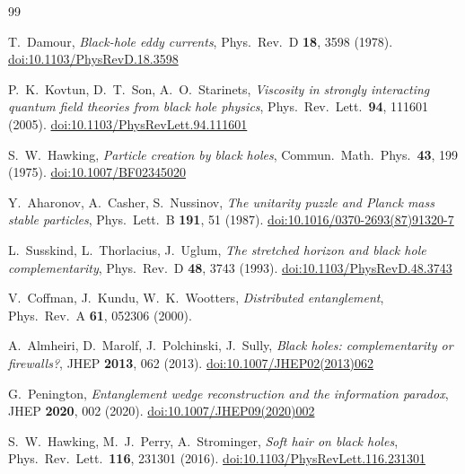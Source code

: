\documentclass[11pt,a4paper]{article}
\begin{document}
\clearpage
\sloppy\raggedright
\begin{thebibliography}{99}

  T.~Damour,
  \textit{Black-hole eddy currents},
  Phys.\ Rev.\ D \textbf{18}, 3598 (1978).
  \href{https://doi.org/10.1103/PhysRevD.18.3598}{doi:10.1103/PhysRevD.18.3598}

  P.~K.~Kovtun, D.~T.~Son, A.~O.~Starinets,
  \textit{Viscosity in strongly interacting quantum field theories from black hole physics},
  Phys.\ Rev.\ Lett.\ \textbf{94}, 111601 (2005).
  \href{https://doi.org/10.1103/PhysRevLett.94.111601}{doi:10.1103/PhysRevLett.94.111601}

  S.~W.~Hawking,
  \textit{Particle creation by black holes},
  Commun.\ Math.\ Phys.\ \textbf{43}, 199 (1975).
  \href{https://doi.org/10.1007/BF02345020}{doi:10.1007/BF02345020}

  Y.~Aharonov, A.~Casher, S.~Nussinov,
  \textit{The unitarity puzzle and Planck mass stable particles},
  Phys.\ Lett.\ B \textbf{191}, 51 (1987).
  \href{https://doi.org/10.1016/0370-2693(87)91320-7}{doi:10.1016/0370-2693(87)91320-7}

  L.~Susskind, L.~Thorlacius, J.~Uglum,
  \textit{The stretched horizon and black hole complementarity},
  Phys.\ Rev.\ D \textbf{48}, 3743 (1993).
  \href{https://doi.org/10.1103/PhysRevD.48.3743}{doi:10.1103/PhysRevD.48.3743}

  V.~Coffman, J.~Kundu, W.~K.~Wootters,
  \textit{Distributed entanglement},
  Phys.\ Rev.\ A \textbf{61}, 052306 (2000).

  A.~Almheiri, D.~Marolf, J.~Polchinski, J.~Sully,
  \textit{Black holes: complementarity or firewalls?},
  JHEP \textbf{2013}, 062 (2013).
  \href{https://doi.org/10.1007/JHEP02(2013)062}{doi:10.1007/JHEP02(2013)062}

  G.~Penington,
  \textit{Entanglement wedge reconstruction and the information paradox},
  JHEP \textbf{2020}, 002 (2020).
  \href{https://doi.org/10.1007/JHEP09(2020)002}{doi:10.1007/JHEP09(2020)002}

  S.~W.~Hawking, M.~J.~Perry, A.~Strominger,
  \textit{Soft hair on black holes},
  Phys.\ Rev.\ Lett.\ \textbf{116}, 231301 (2016).
  \href{https://doi.org/10.1103/PhysRevLett.116.231301}{doi:10.1103/PhysRevLett.116.231301}


\end{thebibliography}
\end{document}
